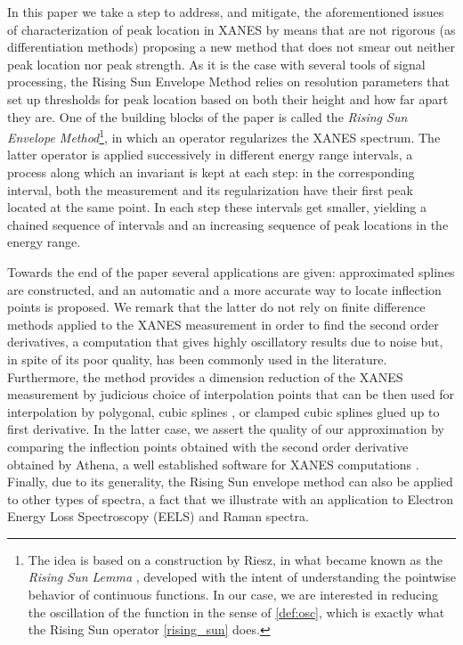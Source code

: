\documentclass[%
 reprint,
 amsmath,amssymb,
 aps,
]{revtex4-1}
\begin{document}
 In this paper we take a step to address, and mitigate,  the aforementioned issues of characterization of peak location in XANES by means that are not rigorous (as differentiation methods) proposing a new method that does not smear out neither peak location nor peak strength. As it is the case with several tools of signal processing, the Rising Sun Envelope Method relies on resolution parameters that set up thresholds for peak location based on both their height and   how far apart they are.   One of the building blocks of the paper is called  the \textit{Rising Sun Envelope Method}\footnote{The idea is based on a construction by Riesz, in what became known as the \textit{Rising Sun Lemma} \cite[Lemma 3.5]{Stein}, developed with the intent of understanding the pointwise behavior of continuous functions. In our case, we are interested in reducing the oscillation of the function in the sense of \ref{def:osc}, which is exactly what the Rising Sun operator \ref{rising_sun} does.}, in which an operator regularizes the XANES spectrum. The latter operator is applied successively in different energy range intervals, a  process  along which an invariant is kept at each step: in the corresponding interval, both the measurement and its regularization have their first peak located at the same point. In each step these intervals get smaller, yielding a  chained sequence of intervals and an increasing  sequence of peak locations in the energy range.
 
Towards the end of the paper several applications are given: approximated splines are constructed, and an automatic and a more accurate way to locate  inflection points is proposed. We remark that the latter do not rely on finite difference methods applied to the XANES measurement in order to find the second order derivatives, a computation that gives  highly oscillatory results due to noise but, in spite of its poor quality,  has been commonly used in the literature. Furthermore, the method provides a dimension reduction of the XANES measurement by judicious choice of interpolation points that can be then used for interpolation by polygonal, cubic splines , or clamped cubic splines glued up to first derivative. In the latter case, we assert the quality of our approximation by  comparing the inflection points obtained with the second order derivative  obtained by Athena, a well established software for XANES computations \cite{Athena}.  Finally, due to its generality, the Rising Sun envelope method can also be applied to other types of spectra,  a fact that we  illustrate with an application to Electron Energy Loss Spectroscopy (EELS) and Raman spectra. 
 
\end{document}
